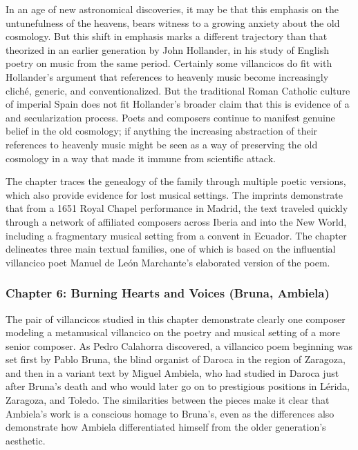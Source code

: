\documentclass{vcbook-proposal}
\begin{document}
In an age of new astronomical discoveries, it may be that this emphasis on the untunefulness of the heavens, bears witness to a growing anxiety about the old cosmology.
But this shift in emphasis marks a different trajectory than that theorized in an earlier generation by John Hollander, in his study of English poetry on music from the same period.%
  \autocite{Hollander:Untuning}
Certainly some villancicos do fit with Hollander's argument that references to heavenly music become increasingly cliché, generic, and conventionalized.
But the traditional Roman Catholic culture of imperial Spain does not fit Hollander's broader claim that this is evidence of a  and secularization process.
Poets and composers continue to manifest genuine belief in the old cosmology; if anything the increasing abstraction of their references to heavenly music might be seen as a way of preserving the old cosmology in a way that made it immune from scientific attack.

The chapter traces the genealogy of the  family through multiple poetic versions, which also provide evidence for lost musical settings.
The imprints demonstrate that from a 1651 Royal Chapel performance in Madrid, the text traveled quickly through a network of affiliated composers across Iberia and into the New World, including a fragmentary musical setting from a convent in Ecuador.
The chapter delineates three main textual families, one of which is based on the influential villancico poet Manuel de León Marchante's elaborated version of the poem. 

\subsubsection{Chapter 6: Burning Hearts and Voices (Bruna, Ambiela)}

The pair of villancicos studied in this chapter demonstrate clearly one composer modeling a metamusical villancico on the poetry and musical setting of a more senior composer.
As Pedro Calahorra discovered, a villancico poem beginning  was set first by Pablo Bruna, the blind organist of Daroca in the region of Zaragoza, and then in a variant text by Miguel Ambiela, who had studied in Daroca just after Bruna's death and who would later go on to prestigious positions in Lérida, Zaragoza, and Toledo.%
  \autocite{Calahorra:Suban}
The similarities between the pieces make it clear that Ambiela's work is a conscious homage to Bruna's, even as the differences also demonstrate how Ambiela differentiated himself from the older generation's aesthetic. 
\end{document}
